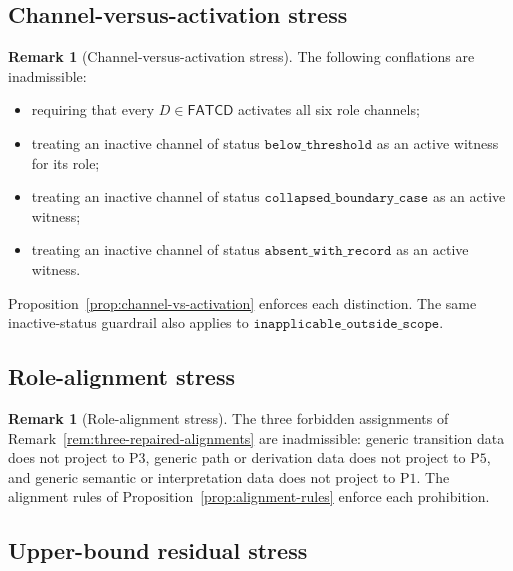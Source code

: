 \documentclass[11pt]{article}
\theoremstyle{definition}
\newtheorem{remark}[theorem]{Remark}
\newcommand{\FATCD}{\ensuremath{\mathsf{FATCD}}}
\newcommand{\belowthr}{\texttt{below\_threshold}}
\newcommand{\collapsedbc}{\texttt{collapsed\_boundary\_case}}
\newcommand{\absentrec}{\texttt{absent\_with\_record}}
\newcommand{\outsidescope}{\texttt{inapplicable\_outside\_scope}}
\newcommand{\Pone}{\ensuremath{\mathrm{P1}}}
\newcommand{\Pthree}{\ensuremath{\mathrm{P3}}}
\newcommand{\Pfive}{\ensuremath{\mathrm{P5}}}
\begin{document}
\subsection{Channel-versus-activation stress}\label{subsec:channel-activation-stress}

\begin{remark}[Channel-versus-activation stress]\label{prop:channel-activation-stress}
The following conflations are inadmissible:
\begin{itemize}[topsep=2pt,itemsep=1pt]
  \item requiring that every \(D \in \FATCD{}\) activates all six role
    channels;
  \item treating an inactive channel of status \(\belowthr\) as an
    active witness for its role;
  \item treating an inactive channel of status \(\collapsedbc\) as an
    active witness;
  \item treating an inactive channel of status \(\absentrec\) as an
    active witness.
\end{itemize}
Proposition~\ref{prop:channel-vs-activation} enforces each distinction.
The same inactive-status guardrail also applies to
\(\outsidescope\).
\end{remark}

\subsection{Role-alignment stress}\label{subsec:role-alignment-stress}

\begin{remark}[Role-alignment stress]\label{prop:role-alignment-stress}
The three forbidden assignments of
Remark~\ref{rem:three-repaired-alignments} are inadmissible: generic
transition data does not project to \Pthree{}, generic path or
derivation data does not project to \Pfive{}, and generic semantic or
interpretation data does not project to \Pone{}. The alignment rules
of Proposition~\ref{prop:alignment-rules} enforce each prohibition.
\end{remark}

\subsection{Upper-bound residual stress}\label{subsec:upper-bound-residual-stress}
\end{document}
